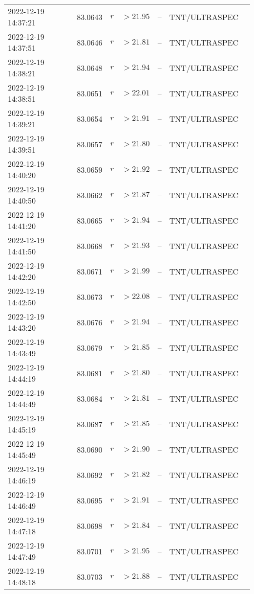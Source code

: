 \documentclass{nature_plusfigure}
\begin{document}
\begin{supplement}
\begin{center}
\begin{longtable}{lllllll}
2022-12-19 14:37:21 & 83.0643 & $r$ & $>21.95$ & -- & TNT/ULTRASPEC &  \\ 
2022-12-19 14:37:51 & 83.0646 & $r$ & $>21.81$ & -- & TNT/ULTRASPEC &  \\ 
2022-12-19 14:38:21 & 83.0648 & $r$ & $>21.94$ & -- & TNT/ULTRASPEC &  \\ 
2022-12-19 14:38:51 & 83.0651 & $r$ & $>22.01$ & -- & TNT/ULTRASPEC &  \\ 
2022-12-19 14:39:21 & 83.0654 & $r$ & $>21.91$ & -- & TNT/ULTRASPEC &  \\ 
2022-12-19 14:39:51 & 83.0657 & $r$ & $>21.80$ & -- & TNT/ULTRASPEC &  \\ 
2022-12-19 14:40:20 & 83.0659 & $r$ & $>21.92$ & -- & TNT/ULTRASPEC &  \\ 
2022-12-19 14:40:50 & 83.0662 & $r$ & $>21.87$ & -- & TNT/ULTRASPEC &  \\ 
2022-12-19 14:41:20 & 83.0665 & $r$ & $>21.94$ & -- & TNT/ULTRASPEC &  \\ 
2022-12-19 14:41:50 & 83.0668 & $r$ & $>21.93$ & -- & TNT/ULTRASPEC &  \\ 
2022-12-19 14:42:20 & 83.0671 & $r$ & $>21.99$ & -- & TNT/ULTRASPEC &  \\ 
2022-12-19 14:42:50 & 83.0673 & $r$ & $>22.08$ & -- & TNT/ULTRASPEC &  \\ 
2022-12-19 14:43:20 & 83.0676 & $r$ & $>21.94$ & -- & TNT/ULTRASPEC &  \\ 
2022-12-19 14:43:49 & 83.0679 & $r$ & $>21.85$ & -- & TNT/ULTRASPEC &  \\ 
2022-12-19 14:44:19 & 83.0681 & $r$ & $>21.80$ & -- & TNT/ULTRASPEC &  \\ 
2022-12-19 14:44:49 & 83.0684 & $r$ & $>21.81$ & -- & TNT/ULTRASPEC &  \\ 
2022-12-19 14:45:19 & 83.0687 & $r$ & $>21.85$ & -- & TNT/ULTRASPEC &  \\ 
2022-12-19 14:45:49 & 83.0690 & $r$ & $>21.90$ & -- & TNT/ULTRASPEC &  \\ 
2022-12-19 14:46:19 & 83.0692 & $r$ & $>21.82$ & -- & TNT/ULTRASPEC &  \\ 
2022-12-19 14:46:49 & 83.0695 & $r$ & $>21.91$ & -- & TNT/ULTRASPEC &  \\ 
2022-12-19 14:47:18 & 83.0698 & $r$ & $>21.84$ & -- & TNT/ULTRASPEC &  \\ 
2022-12-19 14:47:49 & 83.0701 & $r$ & $>21.95$ & -- & TNT/ULTRASPEC &  \\ 
2022-12-19 14:48:18 & 83.0703 & $r$ & $>21.88$ & -- & TNT/ULTRASPEC &  \\ 

\end{longtable}
\end{center}
\end{supplement}
\end{document}
